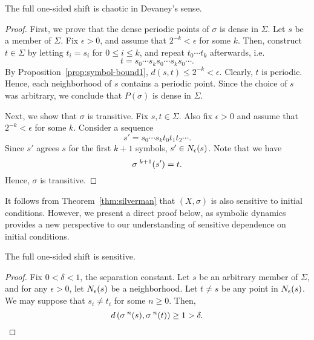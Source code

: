 \documentclass[10pt,twoside]{book}
\begin{document}
\begin{theorem}
  The full one-sided shift is chaotic in Devaney's sense.
  \begin{proof}
    First, we prove that the dense periodic points of $\sigma$ is dense in $\Sigma$.
    Let $s$ be a member of $\Sigma$.
    Fix $\epsilon > 0$, and assume that $2^{-k} < \epsilon$ for some $k$.
    Then, construct $t \in \Sigma$ by letting $t_i = s_i$ for $0 \leq i \leq k$, and repeat $t_0 \cdots t_k$ afterwards, i.e.
    \begin{equation*}
      t = s_0 \cdots s_k s_0 \cdots s_k s_0 \cdots.
    \end{equation*}
    By Proposition~\ref{prop:symbol-bound1}, $d(s,t) \leq 2^{-k} < \epsilon$.
    Clearly, $t$ is periodic.
    Hence, each neighborhood of $s$ contains a periodic point.
    Since the choice of $s$ was arbitrary, we conclude that $P(\sigma)$ is dense in $\Sigma$.

    Next, we show that $\sigma$ is transitive.
    Fix $s,t \in \Sigma$.
    Also fix $\epsilon > 0$ and assume that $2^{-k} < \epsilon$ for some $k$.
    Consider a sequence
    \begin{equation*}
      s' = s_0 \cdots s_k t_0 t_1 t_2 \cdots.
    \end{equation*}
    Since $s'$ agrees $s$ for the first $k+1$ symbols, $s' \in N_{\epsilon}(s)$.
    Note that we have
    \begin{equation*}
      \sigma^{\;k+1}(s') = t.
    \end{equation*}
    Hence, $\sigma$ is transitive.
  \end{proof}
\end{theorem}
It follows from Theorem~\ref{thm:silverman} that $(X, \sigma)$ is also sensitive to initial conditions.
However, we present a direct proof below, as symbolic dynamics provides a new perspective to our understanding of sensitive dependence on initial conditions.
\begin{proposition}
  The full one-sided shift is sensitive.
  \begin{proof}
    Fix $0 < \delta < 1$, the separation constant.
    Let $s$ be an arbitrary member of $\Sigma$, and for any $\epsilon > 0$, let $N_{\epsilon}(s)$ be a neighborhood.
    Let $t \neq s$ be any point in $N_{\epsilon}(s)$.
    We may suppose that $s_i \neq t_i$ for some $n \geq 0$.
    Then,
    \begin{equation*}
      d\left( \sigma^{\;n}(s), \sigma^{\;n}(t) \right) \geq 1 > \delta.
    \end{equation*}
  \end{proof}
\end{proposition}
\end{document}
